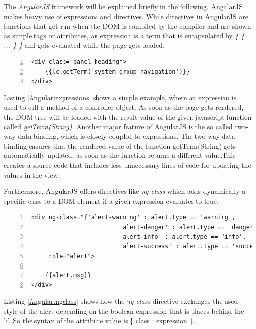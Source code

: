 The \textit{AngularJS} framework will be explained briefly in the following. AngularJS makes heavy use of expressions and directives.
While directives in AngularJS are functions that get run when the DOM is compiled by the compiler and are shown as simple tags or attributes, an expression is a term that is encapsulated by \textit{\{ \{ ... \} \}} and gets evaluated while the page gets loaded.

\begin{lstlisting}[numbers=left,caption={Simple example that shows the use of expressions},label=Angular:expressions,frame=tlbr,breaklines]
<div class="panel-heading"> 
	{{lc.getTerm('system_group_navigation')}} 
</div>
\end{lstlisting}
Listing \ref{Angular:expressions} shows a simple example, where an expression is used to call a method of a controller object. As soon as the page gets rendered, the \ac{DOM}-tree will be loaded with the result value of the given javascript function called \textit{getTerm(String)}. 
Another major feature of AngularJS is the so called two-way data binding, which is closely coupled to expressions. The two-way data binding ensures that the rendered value of the function getTerm(String) gets automatically updated, as soon as the function returns a different value.This creates a source-code that includes less unnecessary lines of code for updating the values in the view. 

Furthermore, AngularJS offers directives like \textit{ng-class} which adds dynamically a specific class to a \ac{DOM}-element if a given expression evaluates to true.

\begin{lstlisting}[numbers=left,caption={Simple example that shows the ng-class directive to change the style respectivly color of an alert depending on its type},label=Angular:ngclass,frame=tlbr,breaklines]
<div ng-class="{'alert-warning' : alert.type == 'warning',
                         'alert-danger' : alert.type == 'danger',
                         'alert-info' : alert.type == 'info',
                         'alert-success' : alert.type == 'success'}"
     role="alert">

	{{alert.msg}}
</div>
\end{lstlisting}
Listing \ref{Angular:ngclass} shows how the \textit{ng-class} directive exchanges the used style of the alert depending on the boolean expression that is places behind the ':'. So the syntax of the attribute value is \{ class : expression \}.

